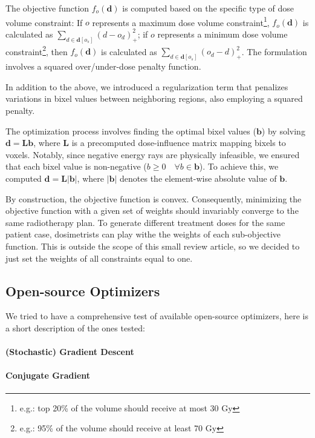 \documentclass[a4paper]{article}
\newcommand{\abs}[1]{|{#1}|}
\begin{document}
	The objective function \(f_o(\mathbf{d})\) is computed based on the specific type of dose volume constraint:
	If \(o\) represents a maximum dose volume constraint\footnote{e.g.: top 20\% of the volume should receive at most 30 Gy}, \(f_o(\mathbf{d})\) is calculated as \(\sum_{d \in \mathbf{d}[o_s]}(d - o_d)_+^2\); if \(o\) represents a minimum dose volume constraint\footnote{e.g.: 95\% of the volume should receive at least 70 Gy}, then \(f_o(\mathbf{d})\) is calculated as \(\sum_{d \in \mathbf{d}[o_s]}(o_d - d)_+^2\).
	The formulation involves a squared over/under-dose penalty function.
	
	In addition to the above, we introduced a regularization term that penalizes variations in bixel values between neighboring regions, also employing a squared penalty.
	
	The optimization process involves finding the optimal bixel values (\(\mathbf{b}\)) by solving \(\mathbf{d} = \mathbf{L}\mathbf{b}\), where \(\mathbf{L}\) is a precomputed dose-influence matrix mapping bixels to voxels.
	Notably, since negative energy rays are physically infeasible, we ensured that each bixel value is non-negative (\(b \geq 0 \quad \forall b \in \mathbf{b}\)).
	To achieve this, we computed \(\mathbf{d} = \mathbf{L}\abs{\mathbf{b}}\), where \(\abs{\mathbf{b}}\) denotes the element-wise absolute value of \(\mathbf{b}\).
	
	By construction, the objective function is convex.
	Consequently, minimizing the objective function with a given set of weights should invariably converge to the same radiotherapy plan.
	To generate different treatment doses for the same patient case, dosimetrists can play withe the weights of each sub-objective function.
	This is outside the scope of this small review article, so we decided to just set the weights of all constraints equal to one.
	
	\subsection{Open-source Optimizers}
	We tried to have a comprehensive test of available open-source optimizers, here is a short description of the ones tested:
	
	\paragraph{(Stochastic) Gradient Descent}
	
	\paragraph{Conjugate Gradient}
	
\end{document}
